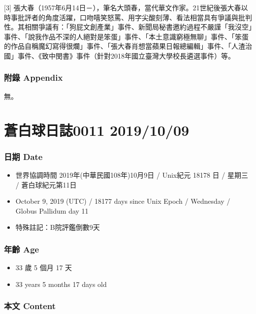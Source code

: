 \documentclass[
]{article}
\providecommand{\tightlist}{%
  \setlength{\itemsep}{0pt}\setlength{\parskip}{0pt}}
\begin{document}
{[}3{]}
張大春（1957年6月14日－），筆名大頭春，當代華文作家。21世紀後張大春以時事批評者的角度活躍，口吻嘻笑怒罵、用字尖酸刻薄、看法相當具有爭議與批判性。其相關爭議有：「狗屁文創產業」事件、新聞局秘書邀約過程不嚴謹「我沒空」事件、「說我作品不深的人絕對是笨蛋」事件、「本土意識窮極無聊」事件、「笨蛋的作品自稱魔幻寫得很爛」事件、「張大春肖想當蘋果日報總編輯」事件、「人渣治國」事件、《致中閔書》事件（針對2018年國立臺灣大學校長遴選事件）等。

\hypertarget{ux9644ux9304-appendix-3}{%
\subsubsection{附錄 Appendix}\label{ux9644ux9304-appendix-3}}

無。

\hypertarget{ux84bcux767dux7403ux65e5ux8a8c0011-20191009}{%
\section{蒼白球日誌0011
2019/10/09}\label{ux84bcux767dux7403ux65e5ux8a8c0011-20191009}}

\hypertarget{ux65e5ux671f-date-8}{%
\subsubsection{日期 Date}\label{ux65e5ux671f-date-8}}

\begin{itemize}
\tightlist
\item
  世界協調時間 2019年(中華民國108年)10月9日 / Unix紀元 18178 日 / 星期三
  / 蒼白球紀元第11日
\item
  October 9, 2019 (UTC) / 18177 days since Unix Epoch / Wednesday /
  Globus Pallidum day 11
\item
  特殊註記：B院評鑑倒數9天
\end{itemize}

\hypertarget{ux5e74ux9f61-age-8}{%
\subsubsection{年齡 Age}\label{ux5e74ux9f61-age-8}}

\begin{itemize}
\tightlist
\item
  33 歲 5 個月 17 天
\item
  33 years 5 months 17 days old
\end{itemize}

\hypertarget{ux672cux6587-content-8}{%
\subsubsection{本文 Content}\label{ux672cux6587-content-8}}
\end{document}
